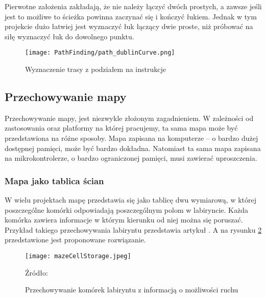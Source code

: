             Pierwotne założenia zakładają, że nie należy łączyć dwóch prostych, a zawsze jeśli jest to możliwe to ścieżka powinna zaczynać się i kończyć łukiem.
            Jednak w tym projekcie dużo łatwiej jest wyznaczyć łuk łączący dwie proste, niż próbować na siłę wyznaczyć łuk do dowolnego punktu.

            \begin{figure}[!ht]
                \centering
                \texttt{[image: PathFinding/path\_dublinCurve.png]}
                \caption{Wyznaczenie trasy z podziałem na instrukcje}
                \label{fig:path_dublin}
            \end{figure}



    \subsection{Przechowywanie mapy}
    \label{subsec:przechowywanie_mapy}
        Przechowywanie mapy, jest niezwykle złożonym zagadnieniem.
        W zależności od zastosowania oraz platformy na której pracujemy, ta sama mapa może być przedstawiona na różne sposoby.
        Mapa zapisana na komputerze -- o bardzo dużej dostępnej pamięci, może być bardzo dokładna.
        Natomiast ta sama mapa zapisana na mikrokontrolerze, o bardzo ograniczonej pamięci, musi zawierać uproszczenia.

        \subsubsection{Mapa jako tablica ścian}
            W wielu projektach mapę przedstawia się jako tablicę dwu wymiarową, w której poszczególne komórki odpowiadają poszczególnym polom w labiryncie.
            Każda komórka zawiera informacje w którym kierunku od niej można się poruszać.
            Przykład takiego przechowywania labiryntu przedstawia artykuł \cite{maze_storage}.
            A na rysunku \ref{fig:mazeCellStorage} przedstawione jest proponowane rozwiązanie.

            \begin{figure}[!ht]
                \centering
                \texttt{[image: mazeCellStorage.jpeg]}
                \caption{Przechowywanie komórek labiryntu z informacją o możliwości ruchu}
                Źródło: \cite{maze_storage}
                \label{fig:mazeCellStorage}
            \end{figure}


